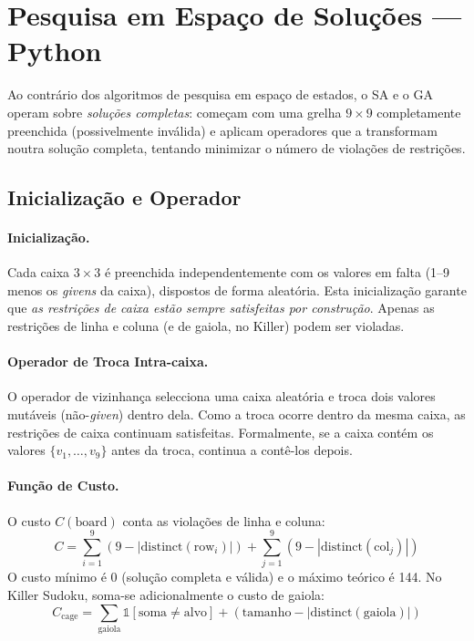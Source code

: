 \section{Pesquisa em Espaço de Soluções — Python}
\label{sec:python}

Ao contrário dos algoritmos de pesquisa em espaço de estados, o SA e o GA operam sobre \emph{soluções completas}: começam com uma grelha $9 \times 9$ completamente preenchida (possivelmente inválida) e aplicam operadores que a transformam noutra solução completa, tentando minimizar o número de violações de restrições.

\subsection{Inicialização e Operador}
\label{ssec:init_op}

\paragraph{Inicialização.}
Cada caixa $3 \times 3$ é preenchida independentemente com os valores em falta (1--9 menos os \emph{givens} da caixa), dispostos de forma aleatória. Esta inicialização garante que \emph{as restrições de caixa estão sempre satisfeitas por construção}. Apenas as restrições de linha e coluna (e de gaiola, no Killer) podem ser violadas.

\paragraph{Operador de Troca Intra-caixa.}
O operador de vizinhança selecciona uma caixa aleatória e troca dois valores mutáveis (não-\emph{given}) dentro dela. Como a troca ocorre dentro da mesma caixa, as restrições de caixa continuam satisfeitas. Formalmente, se a caixa contém os valores $\{v_1, \ldots, v_9\}$ antes da troca, continua a contê-los depois.

\paragraph{Função de Custo.}
O custo $C(\text{board})$ conta as violações de linha e coluna:
\begin{equation}
    C = \sum_{i=1}^{9} (9 - |\text{distinct}(\text{row}_i)|) + \sum_{j=1}^{9} (9 - |\text{distinct}(\text{col}_j)|)
\end{equation}
O custo mínimo é 0 (solução completa e válida) e o máximo teórico é 144. No Killer Sudoku, soma-se adicionalmente o custo de gaiola:
\begin{equation}
    C_{\text{cage}} = \sum_{\text{gaiola}} \mathbb{1}[\text{soma} \neq \text{alvo}] + (\text{tamanho} - |\text{distinct}(\text{gaiola})|)
\end{equation}

